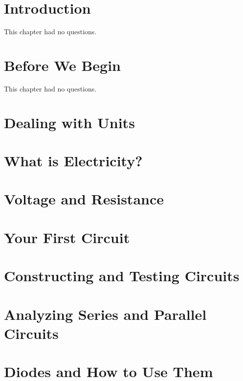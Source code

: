 \documentclass[twocolumn]{book}
\begin{document}
\sloppy

\frontmatter
\tableofcontents
\mainmatter

\chapter{Introduction}

This chapter had no questions.

\chapter{Before We Begin}

This chapter had no questions.

\chapter{Dealing with Units}



\chapter{What is Electricity?}



\chapter{Voltage and Resistance}



\chapter{Your First Circuit}



\chapter{Constructing and Testing Circuits}



\chapter{Analyzing Series and Parallel Circuits}



\chapter{Diodes and How to Use Them}
\end{document}
